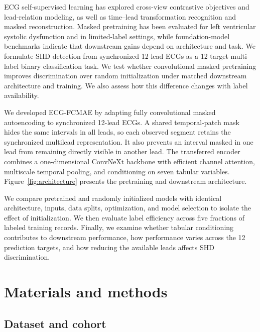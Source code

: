 ECG self-supervised learning has explored cross-view contrastive objectives and lead-relation modeling\cite{kiyasseh2021clocs,mehari2022ssl,oh2022leadagnostic}, as well as time--lead transformation recognition and masked reconstruction\cite{zhang_reverse_2023,zhang2023maefe,na2024stmem,ran_joint_masking_2024}. Masked pretraining has been evaluated for left ventricular systolic dysfunction and in limited-label settings\cite{sawano_masked_lvsd_2024}, while foundation-model benchmarks indicate that downstream gains depend on architecture and task\cite{almasud2026benchmark}. We formulate SHD detection from synchronized 12-lead ECGs as a 12-target multi-label binary classification task. We test whether convolutional masked pretraining improves discrimination over random initialization under matched downstream architecture and training. We also assess how this difference changes with label availability.

We developed ECG-FCMAE by adapting fully convolutional masked autoencoding to synchronized 12-lead ECGs. A shared temporal-patch mask hides the same intervals in all leads, so each observed segment retains the synchronized multilead representation. It also prevents an interval masked in one lead from remaining directly visible in another lead. The transferred encoder combines a one-dimensional ConvNeXt backbone with efficient channel attention, multiscale temporal pooling, and conditioning on seven tabular variables\cite{liu2022convnext,woo2023convnextv2,wang2020ecanet,perez2018film}. Figure~\ref{fig:architecture} presents the pretraining and downstream architecture.

We compare pretrained and randomly initialized models with identical architecture, inputs, data splits, optimization, and model selection to isolate the effect of initialization. We then evaluate label efficiency across five fractions of labeled training records. Finally, we examine whether tabular conditioning contributes to downstream performance, how performance varies across the 12 prediction targets, and how reducing the available leads affects SHD discrimination.

\section{Materials and methods}
\label{sec:methods}

\subsection{Dataset and cohort}
\label{sec:cohort}


